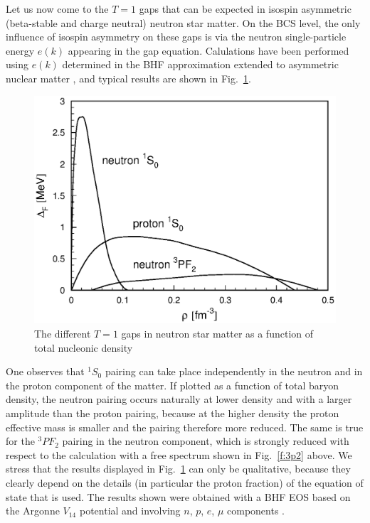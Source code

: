 \documentclass[runningheads]{svmult}
\def\pf{^3\!P\!F_2}
\def\ss{^1\!S_0}
\begin{document}
Let us now come to the $T=1$ gaps that can be expected in isospin asymmetric 
(beta-stable and charge neutral) neutron star matter.
On the BCS level, the only influence of isospin asymmetry on these gaps is via
the neutron single-particle energy $e(k)$ appearing in the gap equation.
Calulations have been performed using $e(k)$ determined in the 
BHF approximation extended to asymmetric nuclear matter 
\cite{BCLL92,ELGA96,CDL,BOMBA,BOMBA2,EEHE96,BBS,VPREH}, 
and typical results are shown in Fig.~\ref{f:gapn}.
\begin{figure}[t] %
\includegraphics[height=.4\textheight,bb=40 380 40 700]{nsbk_all.ps}
\caption[]
{The different $T=1$ gaps in neutron star matter as a function of 
total nucleonic density}
\label{f:gapn}
\end{figure} %
One observes that $\ss$ pairing can take place independently in the 
neutron and in the proton component of the matter.
If plotted as a function of total baryon density, the neutron pairing
occurs naturally at lower density and with a larger amplitude than
the proton pairing, because at the higher density the proton effective
mass is smaller and the pairing therefore more reduced.  
The same is true for the $\pf$ pairing in the neutron component, which is 
strongly reduced with respect to the calculation with a free spectrum 
shown in Fig.~\ref{f:3p2} above.
We stress that the results displayed in Fig.~\ref{f:gapn} can only be 
qualitative, because they clearly depend on the details 
(in particular the proton fraction)
of the equation of state that is used.
The results shown were obtained with a BHF EOS based on the Argonne $V_{14}$
potential and involving $n$, $p$, $e$, $\mu$ components \cite{BOMBA}.
\end{document}
